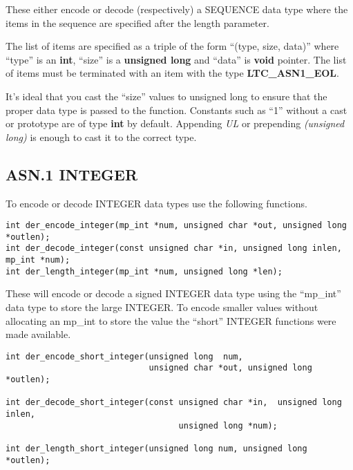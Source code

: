 \documentclass[a4paper]{book}
\begin{document}
These either encode or decode (respectively) a SEQUENCE data type where the items in the sequence are specified after the length parameter.

The list of items are specified as a triple of the form ``(type, size, data)''  where ``type'' is an \textbf{int}, ``size'' is a \textbf{unsigned long}
and ``data'' is \textbf{void} pointer.  The list of items must be terminated with an item with the type \textbf{LTC\_ASN1\_EOL}.

It's ideal that you cast the ``size'' values to unsigned long to ensure that the proper data type is passed to the function.  Constants such as ``1'' without
a cast or prototype are of type \textbf{int} by default.  Appending \textit{UL} or prepending \textit{(unsigned long)} is enough to cast it to the correct type.

\subsection{ASN.1 INTEGER}

To encode or decode INTEGER data types use the following functions.

\begin{verbatim}
int der_encode_integer(mp_int *num, unsigned char *out, unsigned long *outlen);
int der_decode_integer(const unsigned char *in, unsigned long inlen, mp_int *num);
int der_length_integer(mp_int *num, unsigned long *len);
\end{verbatim}

These will encode or decode a signed INTEGER data type using the ``mp\_int'' data type to store the large INTEGER.  To encode smaller values without allocating
an mp\_int to store the value the ``short'' INTEGER functions were made available.

\begin{verbatim}
int der_encode_short_integer(unsigned long  num, 
                             unsigned char *out, unsigned long *outlen);

int der_decode_short_integer(const unsigned char *in,  unsigned long inlen, 
                                   unsigned long *num);

int der_length_short_integer(unsigned long num, unsigned long *outlen);
\end{verbatim}
\end{document}
